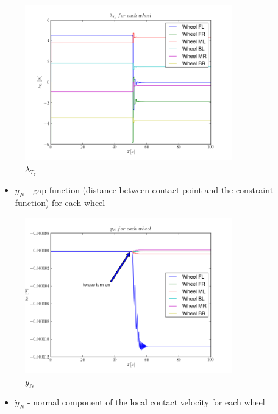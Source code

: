 \begin{figure}[H]
  \centering
    \includegraphics[width=0.8\textwidth]{lambdaTz2}
  \caption{$\lambda_{T_z}$}
\end{figure}

\begin{itemize}
  \item $y_{N}$ - gap function (distance between contact point and the constraint function) for each wheel
\end{itemize}

\begin{figure}[H]
  \centering
    \includegraphics[width=0.8\textwidth]{yN2}
  \caption{$y_{N}$}
\end{figure}

\begin{itemize}
  \item $\dot{y}_{N}$ - normal component of the local contact velocity for each wheel
\end{itemize}


